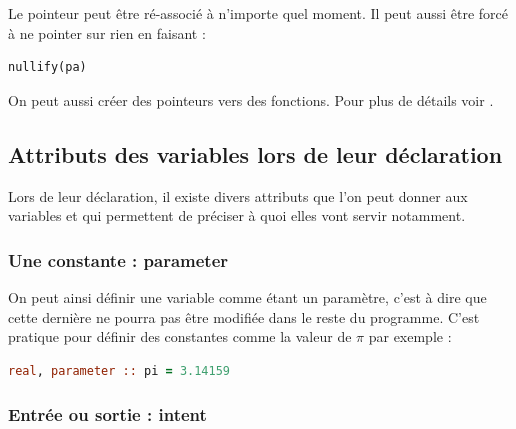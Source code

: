 \documentclass[a4paper,twoside]{article}
\begin{document}
\bigskip

Le pointeur peut être ré-associé à n'importe quel moment. Il peut aussi être forcé à ne pointer sur rien en faisant : 
\begin{verbatim}
nullify(pa)
\end{verbatim}

\bigskip

On peut aussi créer des pointeurs vers des fonctions. Pour plus de détails voir .

\subsection{Attributs des variables lors de leur déclaration}
Lors de leur déclaration, il existe divers attributs que l'on peut donner aux variables et qui permettent de préciser à quoi elles vont servir notamment. 

\subsubsection{Une constante : parameter}

On peut ainsi définir une variable comme étant un paramètre, c'est à dire que cette dernière ne pourra pas être modifiée dans le reste du programme. C'est pratique pour définir des constantes comme la valeur de $\pi$ par exemple : 
\begin{lstlisting}[language=Fortran]
real, parameter :: pi = 3.14159
\end{lstlisting}

\subsubsection{Entrée ou sortie : intent}
\end{document}
